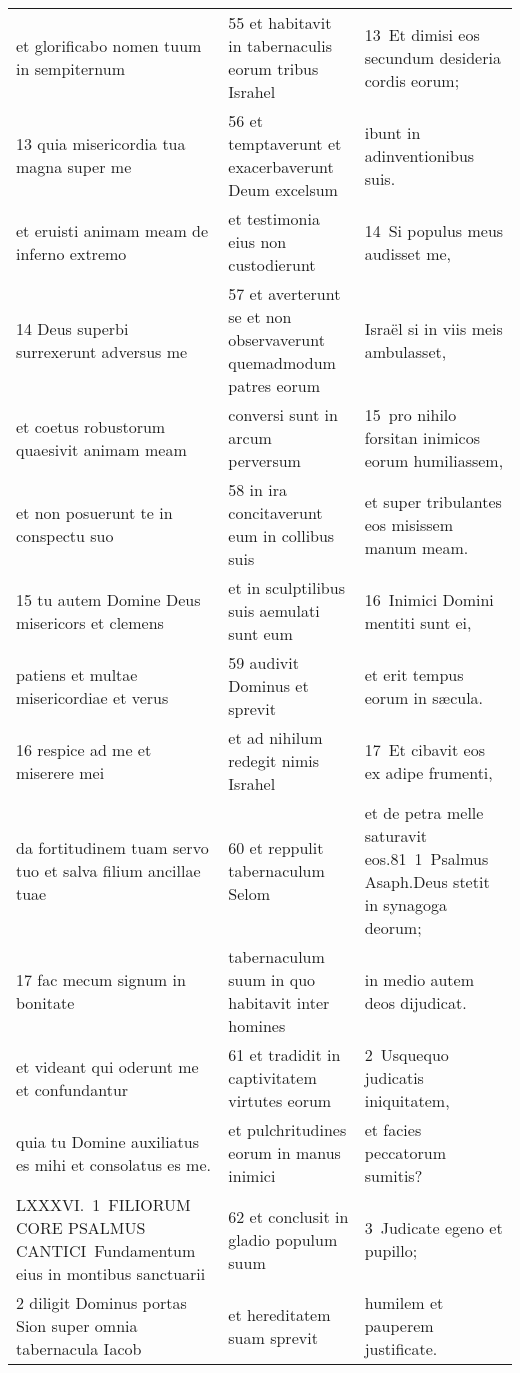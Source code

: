 \documentclass{article}
\begin{document}
\begin{longtable}{@{}p{}p{}p{}@{}}
et glorificabo nomen tuum in sempiternum	&	55 et habitavit in tabernaculis eorum tribus Israhel	&	13 Et dimisi eos secundum desideria cordis eorum;	\\
13 quia misericordia tua magna super me	&	56 et temptaverunt et exacerbaverunt Deum excelsum	&	ibunt in adinventionibus suis.	\\
et eruisti animam meam de inferno extremo	&	et testimonia eius non custodierunt	&	14 Si populus meus audisset me,	\\
14 Deus superbi surrexerunt adversus me	&	57 et averterunt se et non observaverunt quemadmodum patres eorum	&	Israël si in viis meis ambulasset,	\\
et coetus robustorum quaesivit animam meam	&	conversi sunt in arcum perversum	&	15 pro nihilo forsitan inimicos eorum humiliassem,	\\
et non posuerunt te in conspectu suo	&	58 in ira concitaverunt eum in collibus suis	&	et super tribulantes eos misissem manum meam.	\\
15 tu autem Domine Deus misericors et clemens	&	et in sculptilibus suis aemulati sunt eum	&	16 Inimici Domini mentiti sunt ei,	\\
patiens et multae misericordiae et verus	&	59 audivit Dominus et sprevit	&	et erit tempus eorum in sæcula.	\\
16 respice ad me et miserere mei	&	et ad nihilum redegit nimis Israhel	&	17 Et cibavit eos ex adipe frumenti,	\\
da fortitudinem tuam servo tuo et salva filium ancillae tuae	&	60 et reppulit tabernaculum Selom	&	et de petra melle saturavit eos.81 1 Psalmus Asaph.Deus stetit in synagoga deorum;	\\
17 fac mecum signum in bonitate	&	tabernaculum suum in quo habitavit inter homines	&	in medio autem deos dijudicat.	\\
et videant qui oderunt me et confundantur	&	61 et tradidit in captivitatem virtutes eorum	&	2 Usquequo judicatis iniquitatem,	\\
quia tu Domine auxiliatus es mihi et consolatus es me.	&	et pulchritudines eorum in manus inimici	&	et facies peccatorum sumitis?	\\
LXXXVI. 1 FILIORUM CORE PSALMUS CANTICI Fundamentum eius in montibus sanctuarii	&	62 et conclusit in gladio populum suum	&	3 Judicate egeno et pupillo;	\\
2 diligit Dominus portas Sion super omnia tabernacula Iacob	&	et hereditatem suam sprevit	&	humilem et pauperem justificate.	\\

\end{longtable}
\end{document}
